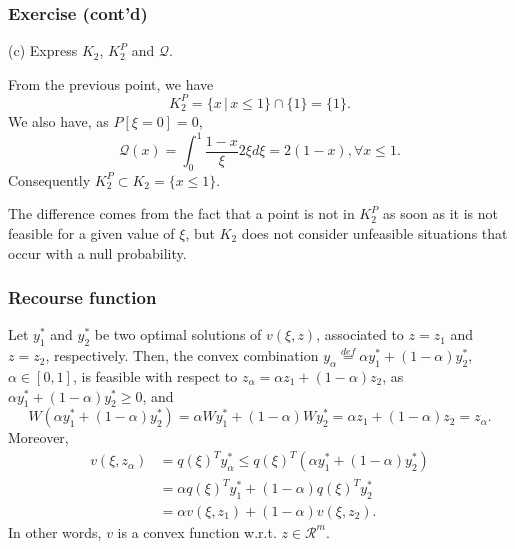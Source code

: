 \documentclass{beamer}
\newtheorem{theo}{Theorem}
\def\bxi{\boldsymbol\xi}
\def\bxi{\boldsymbol\xi}
\def\rit{\mathcal{R}}
\begin{document}
\begin{frame}
\frametitle{Exercise (cont'd)}
	
{\blue (c)} Express $K_2$, $K_2^P$ and $\mathcal{Q}$.
	
\mbox{}
	
From the previous point, we have
\[
K_2^P = \lbrace x \,|\, x \leq 1 \rbrace \cap \lbrace 1 \rbrace =
\lbrace 1 \rbrace.
\]
We also have, as $P[\xi = 0] = 0$,
\[
\mathcal{Q}(x) = \int_0^1 \frac{1-x}{\xi} 2\xi d\xi = 2(1-x), \forall
x \leq 1.
\]
Consequently $K_2^P \subset K_2 = \lbrace x \leq 1 \rbrace$.

\mbox{}

The difference comes from the fact that a point is not in $K_2^P$ as soon as it is not feasible for a given value of $\xi$, but $K_2$ does not consider unfeasible situations that occur with a null probability.
	
	
	
\end{frame}

\begin{frame}
\frametitle{Recourse function}

Let $y^*_1$ and $y^*_2$ be two optimal solutions of $v(\xi, z)$, associated to $z = z_1$ and $z = z_2$, respectively.
Then, the convex combination $y_{\alpha} \overset{def}{=} \alpha y_1^*+(1-\alpha)y_2^*$, $\alpha \in [0,1]$, is feasible with respect to $z_{\alpha} = \alpha z_1 + (1-\alpha) z_2$, as $\alpha y_1^*+(1-\alpha)y_2^* \geq 0$, and
$$
W(\alpha y_1^*+(1-\alpha)y_2^*)
= \alpha W y_1^* + (1-\alpha) W y_2^*
= \alpha z_1 + (1-\alpha) z_2 = z_{\alpha}.
$$
Moreover,
\begin{align*}
v(\xi, z_{\alpha}) & = q(\xi)^Ty_{\alpha}^* \leq
q(\xi)^T(\alpha y_1^*+(1-\alpha)y_2^*) \\
& = \alpha q(\xi)^T y_1^*+(1-\alpha)q(\xi)^Ty_2^* \\
& = \alpha v(\xi, z_1) + (1-\alpha) v(\xi, z_2).
\end{align*}
In other words, $v$ is a convex function w.r.t. $z \in \rit^m$.


\end{frame}
\end{document}
